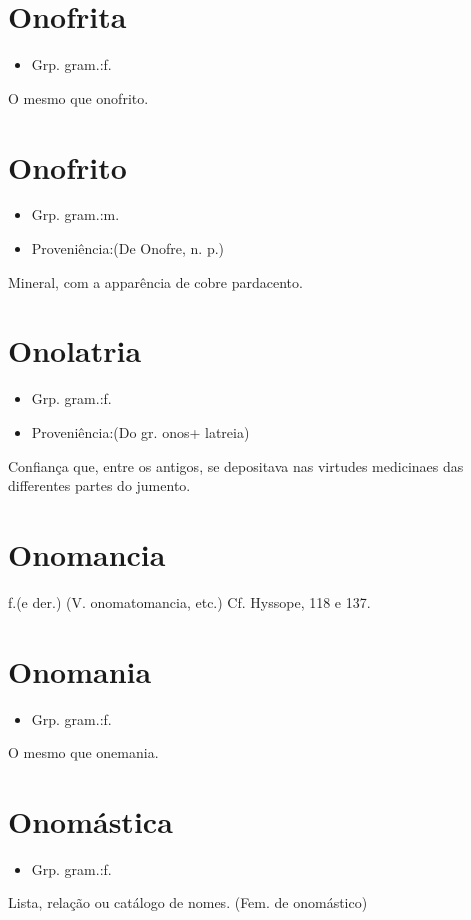 \section{Onofrita}
\begin{itemize}
\item {Grp. gram.:f.}
\end{itemize}
O mesmo que \textunderscore onofrito\textunderscore .
\section{Onofrito}
\begin{itemize}
\item {Grp. gram.:m.}
\end{itemize}
\begin{itemize}
\item {Proveniência:(De \textunderscore Onofre\textunderscore , n. p.)}
\end{itemize}
Mineral, com a apparência de cobre pardacento.
\section{Onolatria}
\begin{itemize}
\item {Grp. gram.:f.}
\end{itemize}
\begin{itemize}
\item {Proveniência:(Do gr. \textunderscore onos\textunderscore  + \textunderscore latreia\textunderscore )}
\end{itemize}
Confiança que, entre os antigos, se depositava nas virtudes medicinaes das differentes partes do jumento.
\section{Onomancia}
\textunderscore f.\textunderscore  (e der.)
(V. \textunderscore onomatomancia\textunderscore , etc.) Cf. \textunderscore Hyssope\textunderscore , 118 e 137.
\section{Onomania}
\begin{itemize}
\item {Grp. gram.:f.}
\end{itemize}
O mesmo que \textunderscore onemania\textunderscore .
\section{Onomástica}
\begin{itemize}
\item {Grp. gram.:f.}
\end{itemize}
Lista, relação ou catálogo de nomes.
(Fem. de \textunderscore onomástico\textunderscore )
